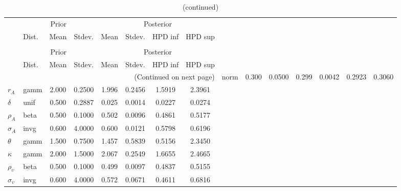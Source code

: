  
\begin{center}
\begin{longtable}{llcccccc} 
\caption{Results from Metropolis-Hastings (parameters)}
 \label{Table:MHPosterior:1}\\
\toprule 
  & \multicolumn{3}{c}{Prior}  &  \multicolumn{4}{c}{Posterior} \\
  \cmidrule(r{.75em}){2-4} \cmidrule(r{.75em}){5-8}
  & Dist. & Mean  & Stdev. & Mean & Stdev. & HPD inf & HPD sup\\
\midrule \endfirsthead 
\caption{(continued)}\\\toprule 
  & \multicolumn{3}{c}{Prior}  &  \multicolumn{4}{c}{Posterior} \\
  \cmidrule(r{.75em}){2-4} \cmidrule(r{.75em}){5-8}
  & Dist. & Mean  & Stdev. & Mean & Stdev. & HPD inf & HPD sup\\
\midrule \endhead 
\bottomrule \multicolumn{8}{r}{(Continued on next page)} \endfoot 
\bottomrule \endlastfoot 
${\alpha}$ & norm &   0.300 & 0.0500 &   0.299& 0.0042 &  0.2923 &  0.3060 \\ 
${r_{A}}$ & gamm &   2.000 & 0.2500 &   1.996& 0.2456 &  1.5919 &  2.3961 \\ 
${\delta}$ & unif &   0.500 & 0.2887 &   0.025& 0.0014 &  0.0227 &  0.0274 \\ 
${\rho_A}$ & beta &   0.500 & 0.1000 &   0.502& 0.0096 &  0.4861 &  0.5177 \\ 
${\sigma_A}$ & invg &   0.600 & 4.0000 &   0.600& 0.0121 &  0.5798 &  0.6196 \\ 
${\theta}$ & gamm &   1.500 & 0.7500 &   1.457& 0.5839 &  0.5156 &  2.3450 \\ 
${\kappa}$ & gamm &   2.000 & 1.5000 &   2.067& 0.2549 &  1.6655 &  2.4665 \\ 
${\rho_\upsilon}$ & beta &   0.500 & 0.1000 &   0.499& 0.0097 &  0.4837 &  0.5155 \\ 
${\sigma_\upsilon}$ & invg &   0.600 & 4.0000 &   0.572& 0.0671 &  0.4611 &  0.6816 \\ 
\end{longtable}
 \end{center}
